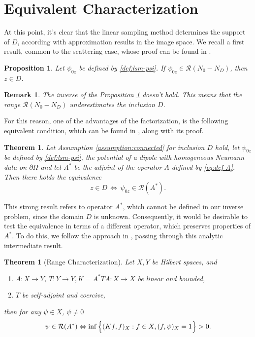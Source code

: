 \documentclass[10pt, a4paper, twoside, openright]{book}
\theoremstyle{definition}
\theoremstyle{plain}
\newtheorem{theorem}[subsection]{Theorem}
\theoremstyle{plain}
\theoremstyle{plain}
\newtheorem{proposition}[subsection]{Proposition}
\theoremstyle{plain}
\newtheorem{remark}[subsection]{Remark}
\theoremstyle{plain}
\theoremstyle{plain}
\theoremstyle{plain}
\theoremstyle{plain}
\begin{document}
\section{Equivalent Characterization}
At this point, it's clear that the linear sampling method determines the support of $D$, according 
with approximation results in the image space. We recall a first result, common to the
scattering case, whose proof can be found in \cite{somersalo:preprint}.
\begin{proposition}
\label{prop:underestimated-range}
 Let $\psi_{0z}$ be defined by \ref{def:lsm-psi}. If $\psi_{0z}\in\mathcal{R}({N_0}-{N_D})$, then $z\in D$.
\end{proposition}
\begin{remark}
 The inverse of the Proposition \ref{prop:underestimated-range} doesn't hold. This means that the range $\mathcal{R}({N_0} - {N_D})$ underestimates the inclusion $D$.
\end{remark}
For this reason, one of the advantages of the factorization, is the following equivalent condition, which can be found in \cite{kirsch:book}, along with its proof.
\begin{theorem}
\label{theo:equivalence}
 Let Assumption \ref{assumption:connected} for inclusion $D$ hold, let $\psi_{0z}$ 
 be defined by \ref{def:lsm-psi}, the potential of a dipole with homogeneous 
 Neumann data on $\partial \Omega$ and let $A^*$ be the adjoint of the operator $A$ defined by \eqref{eq:def-A}.
 Then there holds the equivalence 
 \begin{equation}
  z \in D \,\Longleftrightarrow \,\psi_{0z} \in \mathcal{R}(A^*).
 \end{equation}
\end{theorem}
This strong result refers to operator $A^*$, which cannot be defined in our inverse problem, since 
the domain $D$ is unknown. Consequently, it would be desirable to test the equivalence in terms of a different operator, which preserves properties of $A^*$. To do this, we follow the approach in \cite{kirsch:book}, passing through this analytic intermediate result.
\begin{theorem}[Range Characterization]
\label{theo:range-characterization}
 Let $X,Y$ be Hilbert spaces, and 
 \begin{enumerate}
  \item $A:X\to Y$, $T:Y\to Y, K=A^*TA:X\to X$ be linear and bounded,
  \item $T$ be self-adjoint and coercive,
 \end{enumerate}
 then for any $\psi \in X$, $\psi\neq 0$
 \begin{equation}
 \psi \in \mathcal{R}(A^*) \Leftrightarrow \inf\Big\{(Kf,f)_X   : f\in X, (f,\psi)_X=1\Big\}>0.\\
 \end{equation}
\end{theorem}
\end{document}

